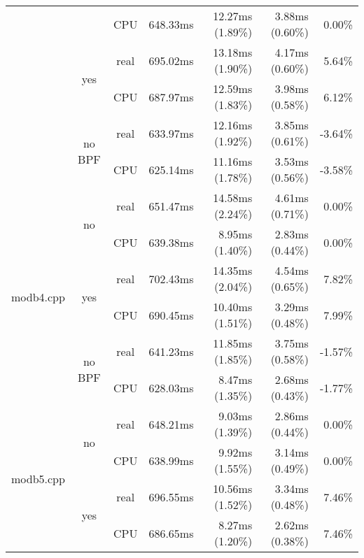 \documentclass[en]{pracamgr}
\begin{document}
\begin{small}
\begin{longtable}{|l|c|c|r|r|r|r|}
                            &                         & CPU  & 648.33ms & 12.27ms (1.89\%) & 3.88ms (0.60\%) & 0.00\% \\*
                            \cline{2-7}
                            & \multirow{2}{*}{yes}    & real & 695.02ms & 13.18ms (1.90\%) & 4.17ms (0.60\%) & 5.64\% \\*
                            &                         & CPU  & 687.97ms & 12.59ms (1.83\%) & 3.98ms (0.58\%) & 6.12\% \\*
                            \cline{2-7}
                            & \multirow{2}{*}{no BPF} & real & 633.97ms & 12.16ms (1.92\%) & 3.85ms (0.61\%) & -3.64\% \\*
                            &                         & CPU  & 625.14ms & 11.16ms (1.78\%) & 3.53ms (0.56\%) & -3.58\% \\
\hline
\multirow{6}{*}{modb4.cpp}  & \multirow{2}{*}{no}     & real & 651.47ms & 14.58ms (2.24\%) & 4.61ms (0.71\%) & 0.00\% \\*
                            &                         & CPU  & 639.38ms & 8.95ms (1.40\%) & 2.83ms (0.44\%) & 0.00\% \\*
                            \cline{2-7}
                            & \multirow{2}{*}{yes}    & real & 702.43ms & 14.35ms (2.04\%) & 4.54ms (0.65\%) & 7.82\% \\*
                            &                         & CPU  & 690.45ms & 10.40ms (1.51\%) & 3.29ms (0.48\%) & 7.99\% \\*
                            \cline{2-7}
                            & \multirow{2}{*}{no BPF} & real & 641.23ms & 11.85ms (1.85\%) & 3.75ms (0.58\%) & -1.57\% \\*
                            &                         & CPU  & 628.03ms & 8.47ms (1.35\%) & 2.68ms (0.43\%) & -1.77\% \\
\hline
\multirow{6}{*}{modb5.cpp}  & \multirow{2}{*}{no}     & real & 648.21ms & 9.03ms (1.39\%) & 2.86ms (0.44\%) & 0.00\% \\*
                            &                         & CPU  & 638.99ms & 9.92ms (1.55\%) & 3.14ms (0.49\%) & 0.00\% \\*
                            \cline{2-7}
                            & \multirow{2}{*}{yes}    & real & 696.55ms & 10.56ms (1.52\%) & 3.34ms (0.48\%) & 7.46\% \\*
                            &                         & CPU  & 686.65ms & 8.27ms (1.20\%) & 2.62ms (0.38\%) & 7.46\% \\*

\end{longtable}
\end{small}
\end{document}
